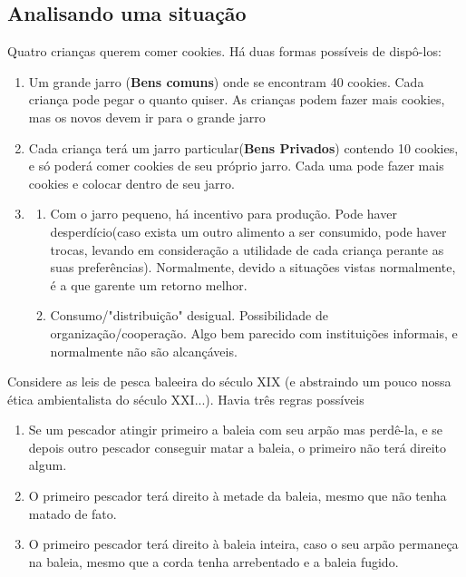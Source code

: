 \documentclass[a4paper,12pt]{article}[abntex2]
\begin{document}
\subsection{\textbf{Analisando uma situação}}
Quatro crianças querem comer cookies. Há duas formas possíveis de dispô-los:\begin{enumerate}
    \item Um grande jarro (\textbf{Bens comuns}) onde se encontram 40 cookies. Cada criança pode pegar o quanto quiser. As crianças podem fazer mais cookies, mas os novos  devem ir para o grande jarro 
    \item Cada criança terá um jarro particular(\textbf{Bens Privados}) contendo 10 cookies, e só poderá comer cookies de seu próprio jarro. Cada uma pode fazer mais cookies e colocar dentro de seu jarro.
    \item \begin{enumerate}
        \item Com o jarro pequeno, há incentivo para produção. Pode haver desperdício(caso exista um outro alimento a ser consumido, pode haver trocas, levando em consideração a utilidade de cada criança perante as suas preferências). Normalmente, devido a situações vistas normalmente, é a que garente um retorno melhor.
        \item Consumo/"distribuição" desigual. Possibilidade de organização/cooperação. Algo bem parecido com instituições informais, e normalmente não são alcançáveis.
    \end{enumerate}
\end{enumerate}

Considere as leis de pesca baleeira do século XIX (e abstraindo um pouco nossa ética ambientalista do século XXI...). Havia três regras possíveis
\begin{enumerate}
    \item Se um pescador atingir primeiro a baleia com seu arpão mas perdê-la, e se depois outro pescador conseguir matar a baleia, o primeiro não terá direito algum.
    \item O primeiro pescador terá direito à metade da baleia, mesmo que não tenha matado de fato.
    \item O primeiro pescador terá direito à baleia inteira, caso o seu arpão permaneça na baleia, mesmo que a corda tenha arrebentado e a baleia fugido.
\end{enumerate}
\end{document}
